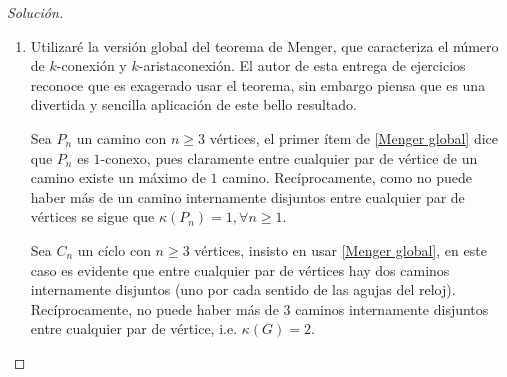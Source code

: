 \documentclass[12pt]{report}
\theoremstyle{plain}
\theoremstyle{definition}
\newenvironment{solution}{\begin{proof}[Solución]}{\end{proof}}
\begin{document}
\begin{solution}
\begin{enumerate}
\item Utilizaré la versión global del teorema de Menger, que caracteriza el número de $k$-conexión y $k$-aristaconexión. El autor de esta entrega de ejercicios reconoce que es exagerado usar el teorema, sin embargo piensa que es una divertida y sencilla aplicación de este bello resultado.

Sea $P_n$ un camino con  $n\geq 3$ vértices, el primer ítem de \ref{Menger global} dice que $P_n$ es $1$-conexo, pues claramente entre cualquier par de vértice de un camino existe un máximo de $1$ camino. Recíprocamente, como no puede haber más de un camino internamente disjuntos entre cualquier par de vértices se sigue que $\kappa (P_n) = 1, \forall n \geq 1$.

Sea $C_n$ un cíclo con $n\geq 3$ vértices, insisto en usar \ref{Menger global}, en este caso es evidente que entre cualquier par de vértices hay dos caminos internamente disjuntos (uno por cada sentido de las agujas del reloj). Recíprocamente, no puede haber más de $3$ caminos internamente disjuntos entre cualquier par de vértice, i.e. $\kappa (G) = 2$.


\end{enumerate}
\end{solution}
\end{document}
